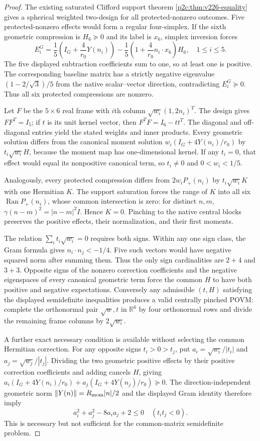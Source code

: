 \documentclass[12pt,a4paper]{article}
\begin{document}
\begin{proof}
The existing saturated Clifford support theorem
\ref{p2c:thm:v226-equality} gives a spherical weighted two-design for
all protected-nonzero outcomes. Five protected-nonzero effects would
form a regular four-simplex. If the sixth geometric compression is
$H_6\succeq0$ and its label is $x_6$, simplex inversion forces
\[
 E_i^G=\frac15\left(I_G+\frac4{r_0}Y(n_i)\right)
 -\frac15\left(1+\frac4{r_0}n_i\cdot x_6\right)H_6,\quad 1\le i\le5.
\]
The five displayed subtraction coefficients sum to one, so at least one
is positive. The corresponding baseline matrix has a strictly negative
eigenvalue $(1-2/\sqrt3)/5$ from the native scalar--vector direction,
contradicting $E_i^G\succeq0$. Thus all six protected compressions
are nonzero.

Let $F$ be the $5\times6$ real frame with $i$th column
$\sqrt{w_i}(1,2n_i)^T$. The design gives $FF^T=I_5$; if $t$ is its
unit kernel vector, then $F^TF=I_6-tt^T$. The diagonal and off-diagonal
entries yield the stated weights and inner products. Every geometric
solution differs from the canonical moment solution
$w_i(I_G+4Y(n_i)/r_0)$ by $t_i\sqrt{w_i}H$, because the moment map has
one-dimensional kernel. If any $t_i=0$, that effect would equal its
nonpositive canonical term, so $t_i\ne0$ and $0<w_i<1/5$.

Analogously, every protected compression differs from
$2w_iP_+(n_i)$ by $t_i\sqrt{w_i}K$ with one Hermitian $K$.
The support saturation forces the range of $K$ into all six
$\operatorname{Ran}P_+(n_i)$, whose common intersection is zero:
for distinct $n,m$, $\gamma(n-m)^2=|n-m|^2I$.
Hence $K=0$. Pinching to the native central blocks preserves the
positive effects, their normalization, and their first moments.

The relation $\sum_i t_i\sqrt{w_i}=0$ requires both signs. Within any
one sign class, the Gram formula gives $n_i\cdot n_j<-1/4$.
Five such vectors would have negative squared norm after summing them.
Thus the only sign cardinalities are $2+4$ and $3+3$.
Opposite signs of the nonzero correction coefficients and the negative
eigenspaces of every canonical geometric term force the common $H$
to have both positive and negative expectations. Conversely any
admissible $(t,H)$ satisfying the displayed semidefinite inequalities
produces a valid centrally pinched POVM: complete the orthonormal
pair $\sqrt w,t$ in $\mathbb R^6$ by four orthonormal rows and divide
the remaining frame columns by $2\sqrt{w_i}$.

A further exact necessary condition is available without selecting the
common Hermitian correction. For any opposite signs $t_i>0>t_j$, put
$a_i=\sqrt{w_i}/|t_i|$ and $a_j=\sqrt{w_j}/|t_j|$.
Dividing the two geometric positive effects by their positive
correction coefficients and adding cancels $H$, giving
$a_i(I_G+4Y(n_i)/r_0)+a_j(I_G+4Y(n_j)/r_0)\succeq0$.
The direction-independent geometric norm $\|Y(n)\|=R_{\rm mom}|n|/2$
and the displayed Gram identity therefore imply
\[
\boxed{a_i^2+a_j^2-8a_ia_j+2\le0}\quad(t_it_j<0).
\]
This is necessary but not sufficient for the common-matrix semidefinite
problem.


\end{proof}
\end{document}
